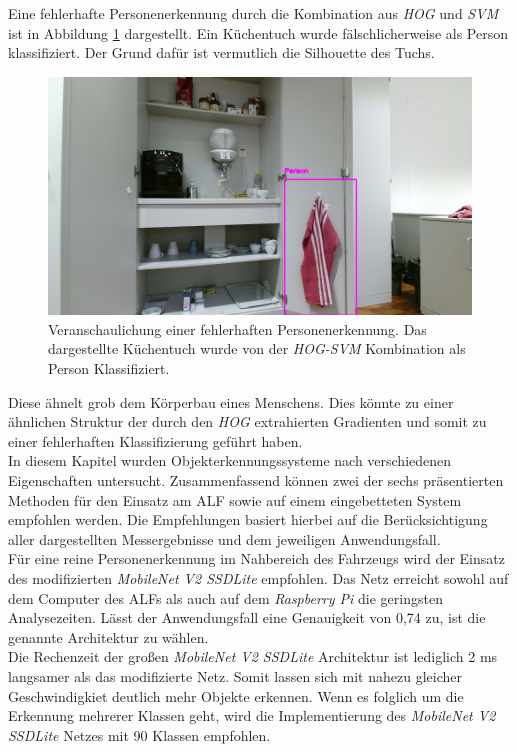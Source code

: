 Eine fehlerhafte Personenerkennung durch die Kombination aus \textit{HOG} und \textit{SVM} ist in Abbildung \ref{fig: hogtest} dargestellt. Ein Küchentuch wurde fälschlicherweise als Person klassifiziert. Der Grund dafür ist vermutlich die Silhouette des Tuchs.\\

	\begin{figure}[H]
	\centering
	\includegraphics[width=1\textwidth]{Bilder/80.jpg}
	\caption{Veranschaulichung einer fehlerhaften Personenerkennung. Das dargestellte Küchentuch wurde von der \textit{HOG-SVM} Kombination als Person Klassifiziert.}
	\label{fig: hogtest}
\end{figure}

 Diese ähnelt grob dem Körperbau eines Menschens. Dies könnte zu einer ähnlichen Struktur der durch den \textit{HOG} extrahierten Gradienten und somit zu einer fehlerhaften Klassifizierung geführt haben.\\





In diesem Kapitel wurden Objekterkennungssysteme nach verschiedenen Eigenschaften untersucht. Zusammenfassend können zwei der sechs präsentierten Methoden für den Einsatz am ALF sowie auf einem eingebetteten System empfohlen werden. Die Empfehlungen basiert hierbei auf die Berücksichtigung aller dargestellten Messergebnisse und dem jeweiligen Anwendungsfall.\\

Für eine reine Personenerkennung im Nahbereich des Fahrzeugs wird der Einsatz des modifizierten \textit{MobileNet V2 SSDLite} empfohlen. Das Netz erreicht sowohl auf dem Computer des ALFs als auch auf dem \textit{Raspberry Pi} die geringsten Analysezeiten. Lässt der Anwendungsfall eine Genauigkeit von 0,74 zu, ist die genannte Architektur zu wählen.\\

Die Rechenzeit der großen \textit{MobileNet V2 SSDLite} Architektur ist lediglich 2 ms langsamer als das modifizierte Netz. Somit lassen sich mit nahezu gleicher Geschwindigkiet deutlich mehr Objekte erkennen. Wenn es folglich um die Erkennung mehrerer Klassen geht, wird die Implementierung des \textit{MobileNet V2 SSDLite} Netzes mit 90 Klassen empfohlen.\\ 